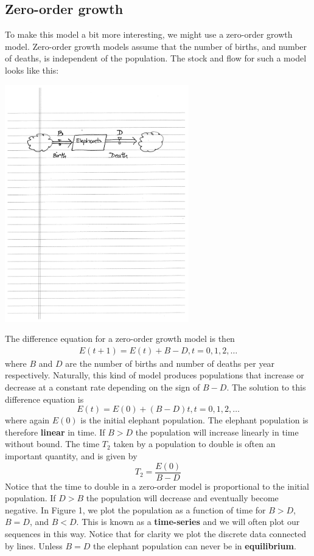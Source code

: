 \subsection{Zero-order growth}

To make this model a bit more interesting, we might use a zero-order growth model.  Zero-order growth models assume that the number of births, and number of deaths, is independent of the population.  The stock and flow for such a model looks like this:

\centerline{\includegraphics[width=8cm]{figs/zero_order_model}}

The difference equation for a zero-order growth model is then
\begin{eqnarray*}
E(t+1) = E(t) + B - D, t = 0,1,2,\ldots
\end{eqnarray*}
where $B$ and $D$ are the number of births and number of deaths per year respectively. Naturally, this kind of model produces populations that increase or decrease at a constant rate depending on the sign of $B-D$. The solution to this difference equation is
$$ E(t) = E(0) + (B-D)t, t = 0,1,2,\ldots $$
where again $E(0)$ is the initial elephant population. The elephant population is therefore {\bf linear} in time. If $B>D$ the population will increase linearly in time without bound. The time $T_2$ taken by a population to double is often an important quantity, and is given by
$$ T_2 = \frac{E(0)}{B-D}$$
Notice that the time to double in a zero-order model is proportional to the initial population. If $D>B$ the population will decrease and eventually become negative. In Figure 1, we plot the population as a function of time for $B>D$, $B=D$, and $B < D$. This is known as a {\bf time-series} and we will often plot our sequences in this way. Notice that for clarity we plot the discrete data connected by lines. Unless $B=D$ the elephant population can never be in {\bf equilibrium}.

